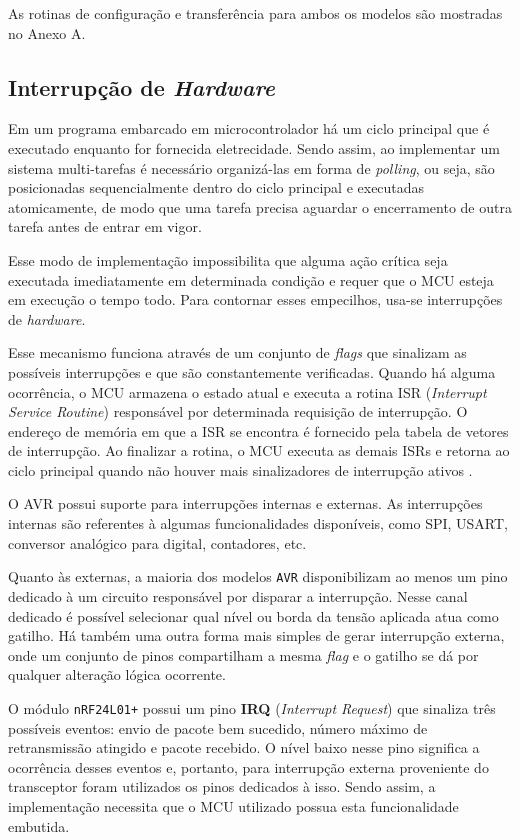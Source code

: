 As rotinas de configuração e transferência para ambos os modelos são mostradas no Anexo A.

\subsection{Interrupção de \textit{Hardware}}
Em um programa embarcado em microcontrolador há um ciclo principal que é executado enquanto for fornecida
eletrecidade. Sendo assim, ao implementar um sistema multi-tarefas é necessário organizá-las em forma de
\textit{polling}, ou seja, são posicionadas sequencialmente dentro do ciclo principal e executadas
atomicamente, de modo que uma tarefa precisa aguardar o encerramento de outra tarefa antes de entrar em vigor.

Esse modo de implementação impossibilita que alguma ação crítica seja executada imediatamente em determinada
condição e requer que o MCU esteja em execução o tempo todo. Para contornar esses empecilhos, usa-se
interrupções de \textit{hardware}.

Esse mecanismo funciona através de um conjunto de \textit{flags} que sinalizam as possíveis interrupções e que
são constantemente verificadas. Quando há alguma ocorrência, o MCU armazena o estado atual e executa a rotina
ISR (\textit{Interrupt Service Routine}) responsável por determinada requisição de interrupção. O endereço de
memória em que a ISR se encontra é fornecido pela tabela de vetores de interrupção. Ao finalizar a rotina, o
MCU executa as demais ISRs e retorna ao ciclo principal quando não houver mais sinalizadores de interrupção
ativos \cite{williams2014}.

O AVR possui suporte para interrupções internas e externas. As interrupções internas são referentes à algumas
funcionalidades disponíveis, como SPI, USART, conversor analógico para digital, contadores, etc.

Quanto às externas, a maioria dos modelos \texttt{AVR} disponibilizam ao menos um pino dedicado à um circuito
responsável por disparar a interrupção. Nesse canal dedicado é possível selecionar qual nível ou borda da tensão
aplicada atua como gatilho. Há também uma outra forma mais simples de gerar interrupção externa, onde um
conjunto de pinos compartilham a mesma \textit{flag} e o gatilho se dá por qualquer alteração lógica
ocorrente.

O módulo \texttt{nRF24L01+} possui um pino \textbf{IRQ} (\textit{Interrupt Request}) que sinaliza três possíveis
eventos: envio de pacote bem sucedido, número máximo de retransmissão atingido e pacote recebido. O nível
baixo nesse pino significa a ocorrência desses eventos e, portanto, para interrupção externa proveniente do
transceptor foram utilizados os pinos dedicados à isso. Sendo assim, a implementação necessita que o MCU
utilizado possua esta funcionalidade embutida.

